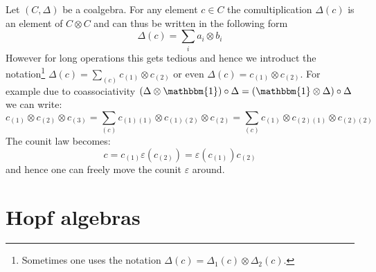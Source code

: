 	
	\begin{notation}
		Let $(C, \Delta)$ be a coalgebra. For any element $c\in C$ the comultiplication $\Delta(c)$ is an element of $C\otimes C$ and can thus be written in the following form \[\Delta(c) = \sum_ia_i\otimes b_i\]
		However for long operations this gets tedious and hence we introduct the notation\footnote{Sometimes one uses the notation $\Delta(c) = \Delta_1(c)\otimes\Delta_2(c)$.} $\Delta(c) = \sum_{(c)}c_{(1)}\otimes c_{(2)}$ or even $\Delta(c) = c_{(1)}\otimes c_{(2)}$. For example due to coassociativity $(\Delta\otimes\mathbbm{1})\circ\Delta = (\mathbbm{1}\otimes\Delta)\circ\Delta$ we can write: \[c_{(1)}\otimes c_{(2)}\otimes c_{(3)} = \sum_{(c)} c_{(1)(1)}\otimes c_{(1)(2)}\otimes c_{(2)} = \sum_{(c)} c_{(1)}\otimes c_{(2)(1)}\otimes c_{(2)(2)}\]
		The counit law becomes: \[c = c_{(1)}\varepsilon(c_{(2)}) = \varepsilon(c_{(1)})c_{(2)}\]
		and hence one can freely move the counit $\varepsilon$ around.
	\end{notation}

\section{Hopf algebras}

